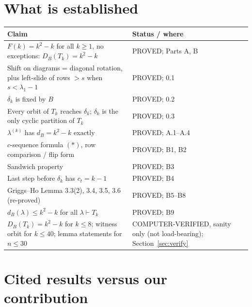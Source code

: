 \documentclass[11pt]{article}
\newcommand{\DB}{D_B}
\newcommand{\dB}{d_B}
\begin{document}
\section{What is established}

\begin{tabular}{p{}p{}}
\hline
Claim & Status / where \\
\hline
$F(k)=k^2-k$ for all $k\ge1$, no exceptions: $\DB(T_k)=k^2-k$ & PROVED; Parts A, B \\
Shift on diagrams = diagonal rotation, plus left-slide of rows $>s$ when $s<\lambda_1-1$ & PROVED; 0.1 \\
$\delta_k$ is fixed by $B$ & PROVED; 0.2 \\
Every orbit of $T_k$ reaches $\delta_k$; $\delta_k$ is the only cyclic partition of $T_k$ & PROVED; 0.3 \\
$\lambda^{(k)}$ has $\dB=k^2-k$ exactly & PROVED; A.1--A.4 \\
$c$-sequence formula $(*)$, row comparison / flip form & PROVED; B1, B2 \\
Sandwich property & PROVED; B3 \\
Last step before $\delta_k$ has $c_t=k-1$ & PROVED; B4 \\
Griggs--Ho Lemma 3.3(2), 3.4, 3.5, 3.6 (re-proved) & PROVED; B5--B8 \\
$\dB(\lambda)\le k^2-k$ for all $\lambda\vdash T_k$ & PROVED; B9 \\
$\DB(T_k)=k^2-k$ for $k\le 8$; witness orbit for $k\le 40$; lemma statements for $n\le 30$ & COMPUTER-VERIFIED, sanity only (not load-bearing); Section~\ref{sec:verify} \\
\hline
\end{tabular}

\section{Cited results versus our contribution}\label{sec:cited}
\end{document}
